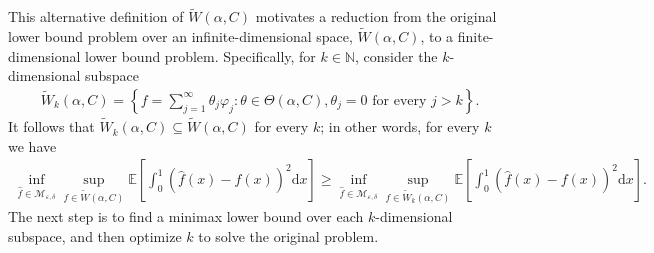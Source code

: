 \documentclass[letterpaper,12pt]{article}
\renewcommand{\d}{\mathrm{d}}
\numberwithin{equation}{section}
\theoremstyle{plain}
\numberwithin{Theorem}{section}
\numberwithin{proposition}{section}
\numberwithin{Lemma}{section}
{
	\theoremstyle{definition}
	\newtheorem{Definition}{Definition}
	\newtheorem{example}{Example}
	\numberwithin{example}{section}
	\newtheorem{fact}{Fact}
	\numberwithin{fact}{section}
	\newtheorem{remark}{Remark}
}
\newcommand{\1}{\mathbbm{1}}
\def\E{\mathbb{E}}
\begin{document}
	This alternative definition of $\tilde W(\alpha, C)$ motivates a reduction from the original lower bound problem over an infinite-dimensional space, $\tilde W(\alpha, C)$, to a finite-dimensional lower bound problem. Specifically, for $k \in \mathbb N$, consider the $k$-dimensional subspace
	\begin{align*}
		\tilde W_k(\alpha, C) = \left\{f = \sum_{j=1}^\infty \theta_j \varphi_j: \theta \in \Theta(\alpha, C), \theta_j = 0 \text{ for every } j > k\right\}.
	\end{align*}
	It follows that $\tilde W_k(\alpha, C) \subseteq \tilde W(\alpha, C)$ for every $k$; in other words, for every $k$ we have
	\begin{align}\label{eq: nonparametric integrated risk reduction to finite}
		\inf_{\hat f \in \mathcal M_{\varepsilon, \delta}} \sup_{f \in \tilde W(\alpha, C)} \E \left[ \int_0^1 (\hat f(x) - f(x))^2 \d x \right] \geq \inf_{\hat f \in \mathcal M_{\varepsilon, \delta}} \sup_{f \in \tilde W_k(\alpha, C)} \E \left[ \int_0^1 (\hat f(x) - f(x))^2 \d x \right].
	\end{align}
	The next step is to find a minimax lower bound over each $k$-dimensional subspace, and then optimize $k$ to solve the original problem.
	
\end{document}

